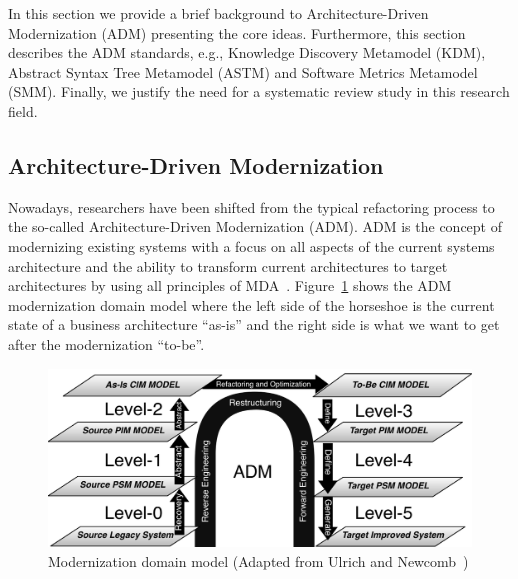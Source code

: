 In this section we provide a brief background to Architecture-Driven Modernization (ADM) presenting the core ideas. Furthermore, this section describes the ADM standards, e.g., Knowledge Discovery Metamodel (KDM), Abstract Syntax Tree Metamodel (ASTM) and Software Metrics Metamodel (SMM). Finally, we  justify the need for a systematic review study in this research field.

\subsection{Architecture-Driven Modernization}

Nowadays, researchers have been shifted from the typical refactoring process to the so-called Architecture-Driven Modernization (ADM). ADM is the concept of modernizing existing systems with a focus on all aspects of the current systems architecture and the ability to transform current architectures to target architectures by using all principles of MDA~\cite[p.~60]{Ulrich:2010:IST:1841736}. Figure~\ref{horseshoe} shows the ADM modernization domain model where the left side of the horseshoe is the current state of a business architecture ``as-is'' and the right side is what we want to get after the modernization ``to-be''.


\begin{figure}[!ht]
\centering
  \includegraphics[scale=0.4]{figuras/Fonte_horse_shoe}
\caption{Modernization domain model (Adapted from Ulrich and Newcomb~\cite{Ulrich:2010:IST:1841736})}
\label{horseshoe}
\end{figure}

